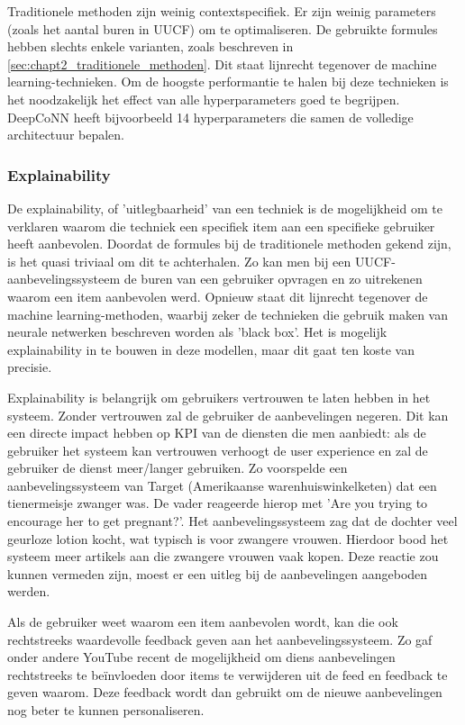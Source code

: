 Traditionele methoden zijn weinig contextspecifiek. Er zijn weinig parameters (zoals het aantal buren in UUCF) om te optimaliseren. De gebruikte formules hebben slechts enkele varianten, zoals beschreven in \autoref{sec:chapt2_traditionele_methoden}. Dit staat lijnrecht tegenover de machine learning-technieken. Om de hoogste performantie te halen bij deze technieken is het noodzakelijk het effect van alle hyperparameters goed te begrijpen. DeepCoNN heeft bijvoorbeeld 14 hyperparameters die samen de volledige architectuur bepalen. \cite{deepconn_github}
\subsubsection{Explainability}
De explainability, of 'uitlegbaarheid' van een techniek is de mogelijkheid om te verklaren waarom die techniek een specifiek item aan een specifieke gebruiker heeft aanbevolen. Doordat de formules bij de traditionele methoden gekend zijn, is het quasi triviaal om dit te achterhalen. Zo kan men bij een UUCF-aanbevelingssysteem de buren van een gebruiker opvragen en zo uitrekenen waarom een item aanbevolen werd. Opnieuw staat dit lijnrecht tegenover de machine learning-methoden, waarbij zeker de technieken die gebruik maken van neurale netwerken beschreven worden als 'black box'. Het is mogelijk explainability in te bouwen in deze modellen, maar dit gaat ten koste van precisie. \cite{explainable_ai_recsys, explainable_recsys_autoencoders}

Explainability is belangrijk om gebruikers vertrouwen te laten hebben in het systeem. Zonder vertrouwen zal de gebruiker de aanbevelingen negeren. Dit kan een directe impact hebben op KPI van de diensten die men aanbiedt: als de gebruiker het systeem kan vertrouwen verhoogt de user experience en zal de gebruiker de dienst meer/langer gebruiken. Zo voorspelde een aanbevelingssysteem van Target (Amerikaanse warenhuiswinkelketen) dat een tienermeisje zwanger was. De vader reageerde hierop met 'Are you trying to encourage her to get pregnant?'. Het aanbevelingssysteem zag dat de dochter veel geurloze lotion kocht, wat typisch is voor zwangere vrouwen. Hierdoor bood het systeem meer artikels aan die zwangere vrouwen vaak kopen. \cite{recsys_baby_lotion_target} Deze reactie zou kunnen vermeden zijn, moest er een uitleg bij de aanbevelingen aangeboden werden.

Als de gebruiker weet waarom een item aanbevolen wordt, kan die ook rechtstreeks waardevolle feedback geven aan het aanbevelingssysteem. Zo gaf onder andere YouTube recent de mogelijkheid om diens aanbevelingen rechtstreeks te beïnvloeden door items te verwijderen uit de feed en feedback te geven waarom. \cite{youtube_on_recommendations} Deze feedback wordt dan gebruikt om de nieuwe aanbevelingen nog beter te kunnen personaliseren.

